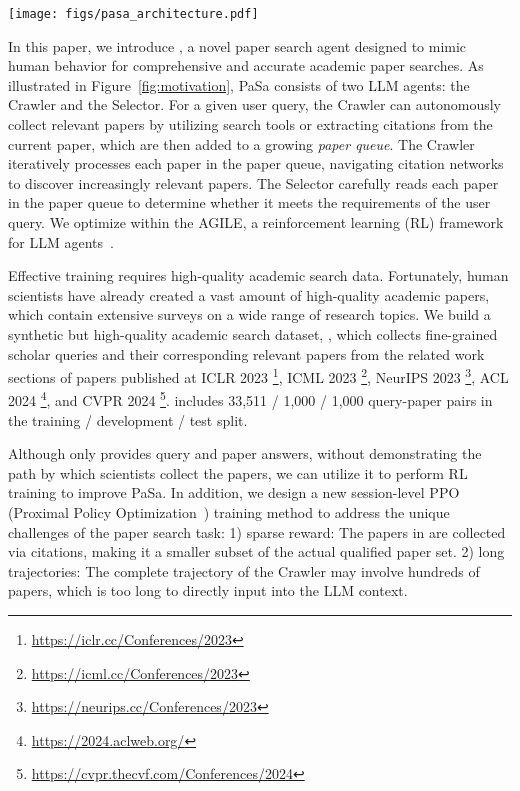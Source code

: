 \begin{figure*}[!t] 
\centering 
\texttt{[image: figs/pasa\_architecture.pdf]} 
\caption{Architecture of \pasa. The system consists of two LLM agents, Crawler and Selector. The Crawler processes the user query and can access papers from the paper queue. It can autonomously invoke the search tool, expand citations, or stop processing of the current paper. All papers collected by the Crawler are appended to the paper queue. The Selector reads each paper in the paper queue to determine whether it meets the criteria specified in the user query.} 
\label{fig:motivation} 
\vspace{-10pt}
\end{figure*}

In this paper, we introduce \pasa, a novel paper search agent designed to mimic human behavior for comprehensive and accurate academic paper searches. As illustrated in Figure~\ref{fig:motivation}, PaSa consists of two LLM agents: the Crawler and the Selector. For a given user query, the Crawler can autonomously collect relevant papers by utilizing search tools or extracting citations from the current paper, which are then added to a growing \emph{paper queue}. The Crawler iteratively processes each paper in the paper queue, navigating citation networks to discover increasingly relevant papers. The Selector carefully reads each paper in the paper queue to determine whether it meets the requirements of the user query. We optimize \pasa within the AGILE, a reinforcement learning (RL) framework for LLM agents~\cite{feng2024agile}.

Effective training requires high-quality academic search data. Fortunately, human scientists have already created a vast amount of high-quality academic papers, which contain extensive surveys on a wide range of research topics. We build a synthetic but high-quality academic search dataset, \autoS, which collects fine-grained scholar queries and their corresponding relevant papers from the related work sections of papers published at ICLR 2023 \footnote{\url{https://iclr.cc/Conferences/2023}}, ICML 2023 \footnote{\url{https://icml.cc/Conferences/2023}}, NeurIPS 2023 \footnote{\url{https://neurips.cc/Conferences/2023}}, ACL 2024 \footnote{\url{https://2024.aclweb.org/}}, and CVPR 2024 \footnote{\url{https://cvpr.thecvf.com/Conferences/2024}}. \autoS includes 33,511 / 1,000 / 1,000 query-paper pairs in the training / development / test split. 

Although \autoS only provides query and paper answers, without demonstrating the path by which scientists collect the papers, we can utilize it to perform RL training to improve PaSa. In addition, we design a new session-level PPO (Proximal Policy Optimization~\cite{schulman2017proximal}) training method to address the unique challenges of the paper search task: 1) sparse reward: The papers in \autoS are collected via citations, making it a smaller subset of the actual qualified paper set. 2) long trajectories: The complete trajectory of the Crawler may involve hundreds of papers, which is too long to directly input into the LLM context. 

